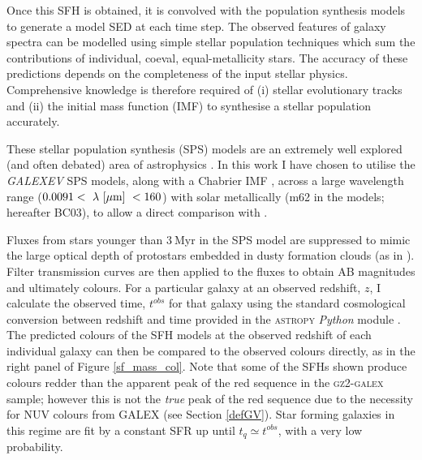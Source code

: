 Once this SFH is obtained, it is convolved with the \citet{BC03} population synthesis models to generate a model SED at each time step. The observed features of galaxy spectra can be modelled using simple stellar population techniques which sum the contributions of individual, coeval, equal-metallicity stars. The accuracy of these predictions depends on the completeness of the input stellar physics. Comprehensive knowledge is therefore required of (i) stellar evolutionary tracks and (ii) the initial mass function (IMF) to synthesise a stellar population accurately. 

These stellar population synthesis (SPS) models are an extremely well explored (and often debated) area of astrophysics \citep{Maraston05, Eminian08, CGW09, falkenberg09, Chen10, Kriek10, miner11, melbourne12}. In this work I have chosen to utilise the \citet{BC03} \emph{GALEXEV} SPS models, along with a Chabrier IMF \citep{chabrier03}, across a large wavelength range ($0.0091 < ~\lambda~\rm{[\mu m]}~ < 160 $) with solar metallically (m62 in the \citet{BC03} models; hereafter BC03), to allow a direct comparison with \citet{schawinski14}.


Fluxes from stars younger than $3~$Myr in the SPS model are suppressed to mimic the large optical depth of protostars embedded in dusty formation clouds (as in \citealt{schawinski14}).  Filter transmission curves are then applied to the fluxes to obtain AB magnitudes and ultimately colours.  For a particular galaxy at an observed redshift, $z$, I calculate the observed time, $t^{obs}$ for that galaxy using the standard cosmological conversion between redshift and time provided in the \textsc{astropy} {\em Python} module \citep{astropy13}. The predicted colours of the SFH models at the observed redshift of each individual galaxy can then be compared to the observed colours directly, as in the right panel of Figure \ref{sf_mass_col}. Note that some of the SFHs shown produce colours redder than the apparent peak of the red sequence in the \textsc{gz2-galex} sample; however this is not the \emph{true} peak of the red sequence due to the necessity for NUV colours from GALEX (see Section \ref{defGV}). Star forming galaxies in this regime are fit by a constant SFR up until $t_q \simeq t^{obs}$, with a very low probability.


